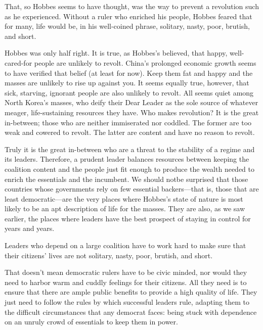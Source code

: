 \documentclass[10pt]{article}
\begin{document}
{\large That, so Hobbes seems to have thought, was the way to prevent a
revolution such as he experienced. Without a ruler who enriched his people,
Hobbes feared that for many, life would be, in his well-coined phrase, solitary,
nasty, poor, brutish, and short.}

{\large Hobbes was only half right. It is true, as Hobbes's believed, that
happy, well-cared-for people are unlikely to revolt. China's prolonged economic
growth seems to have verified that belief (at least for now). Keep them fat and
happy and the masses are unlikely to rise up against you. It seems equally true,
however, that sick, starving, ignorant people are also unlikely to revolt. All
seems quiet among North Korea's masses, who deify their Dear Leader as the sole
source of whatever meager, life-sustaining resources they have. Who makes
revolution? It is the great in-between; those who are neither immiserated nor
coddled. The former are too weak and cowered to revolt. The latter are content
and have no reason to revolt.}

{\large Truly it is the great in-between who are a threat to the stability of a
regime and its leaders. Therefore, a prudent leader balances resources between
keeping the coalition content and the people just fit enough to produce the
wealth needed to enrich the essentials and the incumbent. We should notbe
surprised that those countries whose governments rely on few essential
backers---that is, those that are least democratic---are the very places where
Hobbes's state of nature is most likely to be an apt description of life for the
masses. They are also, as we saw earlier, the places where leaders have the best
prospect of staying in control for years and years.}

{\large Leaders who depend on a large coalition have to work hard to make sure
that their citizens' lives are not solitary, nasty, poor, brutish, and short.}

{\large That doesn't mean democratic rulers have to be civic minded, nor would
they need to harbor warm and cuddly feelings for their citizens. All they need is
to ensure that there are ample public benefits to provide a high quality of life.
They just need to follow the rules by which successful leaders rule, adapting
them to the difficult circumstances that any democrat faces: being stuck with
dependence on an unruly crowd of essentials to keep them in power.}
\end{document}
